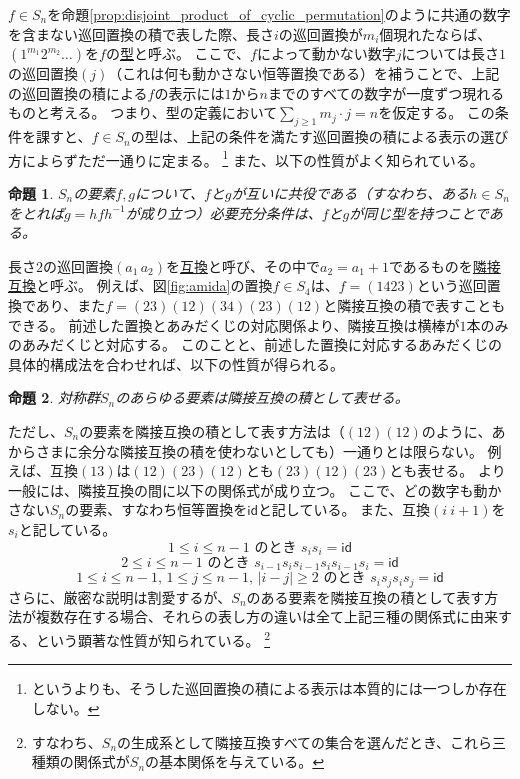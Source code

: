 \documentclass[11pt]{jarticle}
\newtheorem{proposition}{命題}
\begin{document}
$f \in S_n$を命題\ref{prop:disjoint_product_of_cyclic_permutation}のように共通の数字を含まない巡回置換の積で表した際、長さ$i$の巡回置換が$m_i$個現れたならば、$(1^{m_1}2^{m_2} \dots)$を$f$の\underline{型}と呼ぶ。
ここで、$f$によって動かない数字$j$については長さ$1$の巡回置換$(j)$（これは何も動かさない恒等置換である）を補うことで、上記の巡回置換の積による$f$の表示には$1$から$n$までのすべての数字が一度ずつ現れるものと考える。
つまり、型の定義において$\sum_{j \geq 1} m_j \cdot j = n$を仮定する。
この条件を課すと、$f \in S_n$の型は、上記の条件を満たす巡回置換の積による表示の選び方によらずただ一通りに定まる。%
\footnote{というよりも、そうした巡回置換の積による表示は本質的には一つしか存在しない。}
また、以下の性質がよく知られている。

\begin{proposition}
\label{prop:type_of_conjugate_permutations}
$S_n$の要素$f,g$について、$f$と$g$が互いに共役である（すなわち、ある$h \in S_n$をとれば$g = h f h^{-1}$が成り立つ）必要充分条件は、$f$と$g$が同じ型を持つことである。
\end{proposition}

長さ$2$の巡回置換$(a_1\,a_2)$を\underline{互換}と呼び、その中で$a_2 = a_1 + 1$であるものを\underline{隣接互換}と呼ぶ。
例えば、図\ref{fig:amida}の置換$f \in S_4$は、$f = (1423)$という巡回置換であり、また$f = (23)(12)(34)(23)(12)$と隣接互換の積で表すこともできる。
前述した置換とあみだくじの対応関係より、隣接互換は横棒が$1$本のみのあみだくじと対応する。
このことと、前述した置換に対応するあみだくじの具体的構成法を合わせれば、以下の性質が得られる。

\begin{proposition}
\label{prop:generated_by_adjacent_transpositions}
対称群$S_n$のあらゆる要素は隣接互換の積として表せる。
\end{proposition}

ただし、$S_n$の要素を隣接互換の積として表す方法は（$(12)(12)$のように、あからさまに余分な隣接互換の積を使わないとしても）一通りとは限らない。
例えば、互換$(13)$は$(12)(23)(12)$とも$(23)(12)(23)$とも表せる。
より一般には、隣接互換の間に以下の関係式が成り立つ。
ここで、どの数字も動かさない$S_n$の要素、すなわち恒等置換を$\mathsf{id}$と記している。
また、互換$(i\ i+1)$を$s_i$と記している。
\begin{equation}
\label{eq:relation_each_generator}
1 \leq i \leq n-1 \mbox{ のとき } s_i s_i = \mathsf{id}
\end{equation}
\begin{equation}
\label{eq:relation_adjacent_generators}
2 \leq i \leq n-1 \mbox{ のとき } s_{i-1} s_i s_{i-1} s_i s_{i-1} s_i = \mathsf{id}
\end{equation}
\begin{equation}
\label{eq:relation_non-adjacent_generators}
1 \leq i \leq n-1,\,1 \leq j \leq n-1,\,|i-j| \geq 2 \mbox{ のとき } s_i s_j s_i s_j = \mathsf{id}
\end{equation}
さらに、厳密な説明は割愛するが、$S_n$のある要素を隣接互換の積として表す方法が複数存在する場合、それらの表し方の違いは全て上記三種の関係式に由来する、という顕著な性質が知られている。%
\footnote{すなわち、$S_n$の生成系として隣接互換すべての集合を選んだとき、これら三種類の関係式が$S_n$の基本関係を与えている。}
\end{document}
